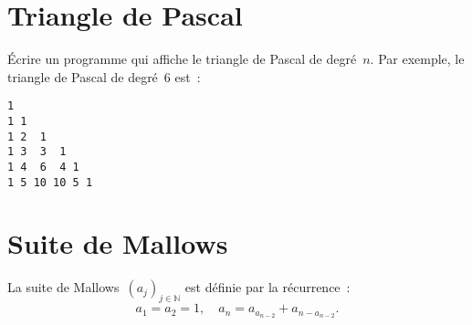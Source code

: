 \section{Triangle de Pascal}
\'Ecrire  un     programme qui   affiche le   triangle   de Pascal  de
degr\'e~$n$.  Par exemple, le triangle de Pascal de degr\'e~$6$ est~:
\begin{verbatim}
1
1 1
1 2  1
1 3  3  1
1 4  6  4 1
1 5 10 10 5 1
\end{verbatim}


\section{Suite de Mallows}
\label{sec:Mallows}

La suite  de Mallows~$(a_{j})_{j\in\mathbb{N}}$  est d\'efinie par  la
r\'ecurrence~:
$$
a_{1}=a_{2}=1,\quad
a_{n}=a_{a_{n-2}}+a_{n-a_{n-2}}.
$$

